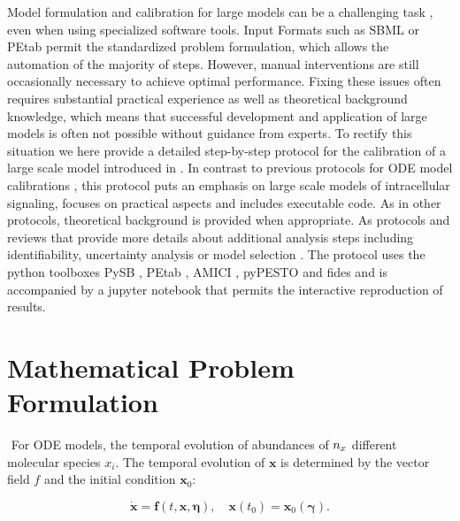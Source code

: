\documentclass[11pt]{article}
\begin{document}
    Model formulation and calibration for large models can be a challenging
task \cite{2754712/C7C8DJNE}, even when using specialized software
tools. Input Formats such as SBML or PEtab \cite{2754712/86CV69R2}
permit the standardized problem formulation, which allows the automation
of the majority of steps. However, manual interventions are still
occasionally necessary to achieve optimal performance. Fixing these
issues often requires substantial practical experience as well as
theoretical background knowledge, which means that successful
development and application of large models is often not possible
without guidance from experts. To rectify this situation we here provide
a detailed step-by-step protocol for the calibration of a large scale
model introduced in \cite{2754712/I4JQ4DMV}. In contrast to previous
protocols for ODE model calibrations
\cite{2754712/3DK88XY2}\cite{2754712/WCVMC7CZ}\cite{2754712/D7NTVFNN}\cite{2754712/RFM5WDSL}\cite{2754712/S5LTETKT}\cite{2754712/HWVK2XI8}\cite{2754712/5ZMDTVIQ}\cite{2754712/Y2DU9IB4}\cite{2754712/5SLVJFMG},
this protocol puts an emphasis on large scale models of intracellular
signaling, focuses on practical aspects and includes executable code. As
in other protocols, theoretical background is provided when appropriate.
As protocols and reviews that provide more details about additional
analysis steps including identifiability, uncertainty analysis or model
selection \cite{2754712/SP36R7LH} . The protocol uses the python
toolboxes PySB , PEtab , AMICI , pyPESTO and fides and is accompanied by
a jupyter notebook that permits the interactive reproduction of results.

    \hypertarget{mathematical-problem-formulation}{%
\section{Mathematical Problem
Formulation}\label{mathematical-problem-formulation}}

    \(\newcommand{\dims}[1]{{n_{#1}}}\) For ODE models, the temporal
evolution of abundances of \(\dims{x}\) different molecular species
\(x_i\). The temporal evolution of \(\textbf{x}\) is determined by the
vector field \(f\) and the initial condition \(\textbf{x}_0\):

\begin{equation}
\dot{\textbf{x}}=\textbf{f}(t,\textbf{x},\boldsymbol{\eta}),\quad \textbf{x}(t_0) = \textbf{x}_0(\boldsymbol{\gamma}).
\label{eq:ode}
\end{equation}
\end{document}
